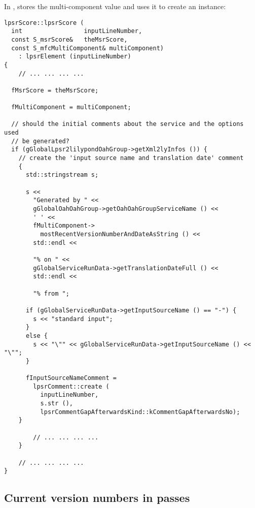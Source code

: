 In ,  stores the multi-component value and uses it to create an  instance:
\begin{lstlisting}[language=CPlusPlus]
lpsrScore::lpsrScore (
  int                 inputLineNumber,
  const S_msrScore&   theMsrScore,
  const S_mfcMultiComponent& multiComponent)
    : lpsrElement (inputLineNumber)
{
	// ... ... ... ...

  fMsrScore = theMsrScore;

  fMultiComponent = multiComponent;

  // should the initial comments about the service and the options used
  // be generated?
  if (gGlobalLpsr2lilypondOahGroup->getXml2lyInfos ()) {
    // create the 'input source name and translation date' comment
    {
      std::stringstream s;

      s <<
        "Generated by " <<
        gGlobalOahOahGroup->getOahOahGroupServiceName () <<
        ' ' <<
        fMultiComponent->
          mostRecentVersionNumberAndDateAsString () <<
        std::endl <<

        "% on " <<
        gGlobalServiceRunData->getTranslationDateFull () <<
        std::endl <<

        "% from ";

      if (gGlobalServiceRunData->getInputSourceName () == "-") {
        s << "standard input";
      }
      else {
        s << "\"" << gGlobalServiceRunData->getInputSourceName () << "\"";
      }

      fInputSourceNameComment =
        lpsrComment::create (
          inputLineNumber,
          s.str (),
          lpsrCommentGapAfterwardsKind::kCommentGapAfterwardsNo);
    }

	 	// ... ... ... ...
 	}

 	// ... ... ... ...
}
\end{lstlisting}


\subsection{Current version numbers in passes}\label{Current version numbers in passes}

